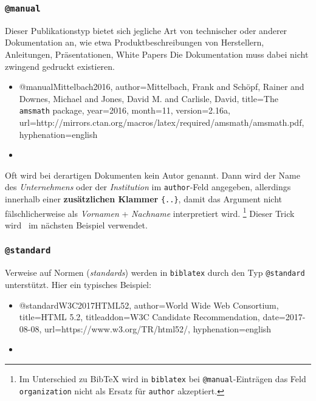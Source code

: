 
\subsubsection{\texttt{@manual}}
\label{sec:@manual}
Dieser Publikationstyp bietet sich jegliche Art von technischer oder anderer Dokumentation an, wie etwa Produktbeschreibungen von Herstellern, Anleitungen, Präsentationen, White Papers \usw Die Dokumentation muss dabei nicht zwingend gedruckt existieren.
%
\begin{itemize}
\item[]
\begin{GenericCode}[numbers=none]
@manual{Mittelbach2016,
  author={Mittelbach, Frank and Schöpf, Rainer and Downes, Michael and Jones, David M. and Carlisle, David},
  title={The \texttt{amsmath} package},
  year={2016},
  month={11},
  version={2.16a},
  url={http://mirrors.ctan.org/macros/latex/required/amsmath/amsmath.pdf},
  hyphenation={english}
}
\end{GenericCode}
\item[\cite{Mittelbach2016}] 
\end{itemize}
%
Oft wird bei derartigen Dokumenten kein Autor genannt. Dann wird der Name des \emph{Unternehmens} oder der \emph{Institution} im \texttt{author}-Feld angegeben, allerdings innerhalb einer \textbf{zusätzlichen Klammer} \texttt{\{..\}}, damit das Argument nicht fälschlicherweise als \emph{Vornamen} + \emph{Nachname} interpretiert wird.%
\footnote{Im Unterschied zu BibTeX wird in \texttt{biblatex} bei \texttt{@manual}-Einträgen das Feld \texttt{organization} nicht als Ersatz für \texttt{author} akzeptiert.}
Dieser Trick wird \ua\ im nächsten Beispiel verwendet.



\subsubsection{\texttt{@standard}}
\label{sec:@standard}


Verweise auf Normen (\emph{standards}) werden in \texttt{biblatex} durch den Typ \texttt{@standard}
unterstützt. Hier ein typisches Beispiel:
%
\begin{itemize}
\item[]
\begin{GenericCode}[numbers=none]
@standard{W3C2017HTML52,
  author={{World Wide Web Consortium}},
  title={HTML 5.2},
  titleaddon={W3C Candidate Recommendation},
	date={2017-08-08},
  url={https://www.w3.org/TR/html52/},
	hyphenation={english}
}
\end{GenericCode}
\item[\cite{W3C2017HTML52}] 
\end{itemize}
%

